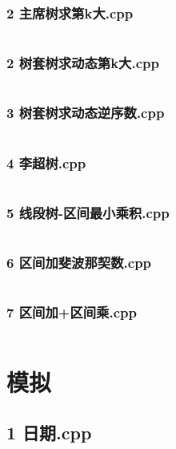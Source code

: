 \documentclass[a4paper,11pt]{article}
\begin{document}
\subsubsection{2 主席树求第k大.cpp}
\inputminted{c++}{"D:/tmplz/templates/数据结构/线段树/2 主席树求第k大.cpp"}
\subsubsection{2 树套树求动态第k大.cpp}
\inputminted{c++}{"D:/tmplz/templates/数据结构/线段树/2 树套树求动态第k大.cpp"}
\subsubsection{3 树套树求动态逆序数.cpp}
\inputminted{c++}{"D:/tmplz/templates/数据结构/线段树/3 树套树求动态逆序数.cpp"}
\subsubsection{4 李超树.cpp}
\inputminted{c++}{"D:/tmplz/templates/数据结构/线段树/4 李超树.cpp"}
\subsubsection{5 线段树-区间最小乘积.cpp}
\inputminted{c++}{"D:/tmplz/templates/数据结构/线段树/5 线段树-区间最小乘积.cpp"}
\subsubsection{6 区间加斐波那契数.cpp}
\inputminted{c++}{"D:/tmplz/templates/数据结构/线段树/6 区间加斐波那契数.cpp"}
\subsubsection{7 区间加+区间乘.cpp}
\inputminted{c++}{"D:/tmplz/templates/数据结构/线段树/7 区间加+区间乘.cpp"}
\section{模拟}
\subsection{1 日期.cpp}
\inputminted{c++}{"D:/tmplz/templates/模拟/1 日期.cpp"}
\end{document}
